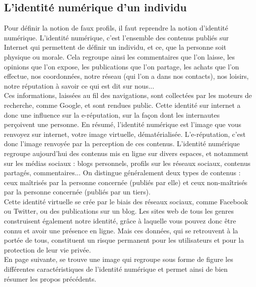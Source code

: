 \documentclass[12pt]{report}
\begin{document}
\subsection{L'identité numérique d'un individu}
Pour définir la notion de faux profils, il faut reprendre la notion d'identité numérique. L'identité numérique, c'est l'ensemble des contenus publiés sur Internet qui permettent de définir un individu, et ce, que la personne soit physique ou morale. Cela regroupe ainsi les commentaires que l'on laisse, les opinions que l'on expose, les publications que l'on partage, les achats que l'on effectue, nos coordonnées, notre réseau (qui l'on a dans nos contacts), nos loisirs, notre réputation à savoir ce qui est dit sur nous... \\

Ces informations, laissées au fil des navigations, sont collectées par les moteurs de recherche, comme Google, et sont rendues public.
Cette identité sur internet a donc une influence sur la e-réputation, sur la façon dont les internautes perçoivent une personne. En résumé, l’identité numérique est l’image que vous renvoyez sur internet, votre image virtuelle, dématérialisée.
L'e-réputation, c'est donc l'image renvoyée par la perception de ces contenus. L'identité numérique regroupe aujourd'hui des contenus mis en ligne sur divers espaces, et notamment sur les médias sociaux : blogs personnels, profils sur les réseaux sociaux, contenus partagés, commentaires... On distingue généralement deux types de contenus : ceux maîtrisés par la personne concernée (publiés par elle) et ceux non-maîtrisés par la personne concernée (publiés par un tiers). \\

Cette identité virtuelle se crée par le biais des réseaux sociaux, comme Facebook ou Twitter, ou des publications sur un blog. Les sites web de tous les genres construisent également notre identité, grâce à laquelle vous pouvez donc être connu et avoir une présence en ligne. Mais ces données, qui se retrouvent à la portée de tous, constituent un risque permanent pour les utilisateurs et pour la protection de leur vie privée. \\

En page suivante, se trouve une image qui regroupe sous forme de figure les différentes caractéristiques de l'identité numérique et permet ainsi de bien résumer les propos précédents. 
\end{document}
